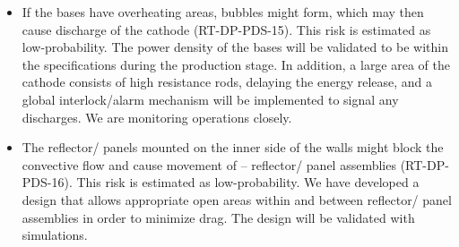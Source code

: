 \begin{itemize}
\item If the  bases have overheating areas, bubbles might form, which may then cause  discharge of the cathode (RT-DP-PDS-15). This risk is estimated as low-probability. The power density of the  bases will be validated to be within the specifications during the production stage. In addition, a large area of the cathode consists of high resistance rods, delaying the energy release, and a global interlock/alarm mechanism will %
be implemented to signal %
any discharges. We are monitoring  operations closely.    

\item The reflector/ panels mounted on the inner side of the  walls might block the  convective flow and cause movement of  -- reflector/ panel assemblies (RT-DP-PDS-16). This risk is estimated as low-probability. We have developed a design that allows appropriate open areas within and between reflector/ panel assemblies in order to minimize drag. The design will be validated with  simulations.


\end{itemize}
